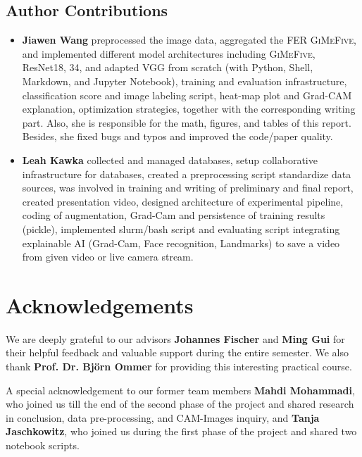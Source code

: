 \subsection*{Author Contributions}
\label{sec:author}

\begin{itemize}
  \item \textbf{Jiawen Wang} preprocessed the image data, aggregated the FER \textsc{GiMeFive}, 
  and implemented different model architectures including \textsc{GiMeFive}, ResNet18, 34, 
  and adapted VGG from scratch (with Python, Shell, Markdown, and Jupyter Notebook), 
  training and evaluation infrastructure, classification score and image labeling script, 
  heat-map plot and Grad-CAM explanation, optimization strategies, 
  together with the corresponding writing part. 
  Also, she is responsible for the math, figures, and tables of this report. 
  Besides, she fixed bugs and typos and improved the code/paper quality. 
  \item \textbf{Leah Kawka} collected and managed databases, 
  setup collaborative infrastructure for databases, created a preprocessing script standardize data sources, 
  was involved in training and writing of preliminary and final report, created presentation video, 
  designed architecture of experimental pipeline, coding of augmentation, Grad-Cam and persistence 
  of training results (pickle), implemented slurm/bash script and evaluating script integrating explainable AI 
  (Grad-Cam, Face recognition, Landmarks) to save a video from given video or live camera stream.
\end{itemize}

\section*{Acknowledgements}

We are deeply grateful to our advisors \textbf{Johannes Fischer} and \textbf{Ming Gui} for their helpful feedback and valuable support during the entire semester. 
We also thank \textbf{Prof. Dr. Björn Ommer} for providing this interesting practical course. 

A special acknowledgement to our former team members \textbf{Mahdi Mohammadi}, who joined us till the end of the 
second phase of the project and shared research in conclusion, data pre-processing, and CAM-Images inquiry, 
and \textbf{Tanja Jaschkowitz}, who joined us during the first phase of the project and shared two notebook scripts.
  
